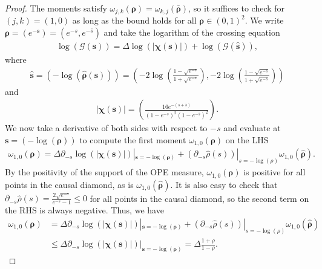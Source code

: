 \documentclass[10pt,a4paper]{amsart}
\newcommand{\De}{\Delta}
\newcommand{\ba}{\begin{equation} \begin{aligned}}
\newcommand{\bs}[1]{\boldsymbol{#1}}
\newcommand{\ea}{\end{aligned} \end{equation}}
\begin{document}
\begin{proof}
The moments satisfy $\omega_{j,k}(\bs{\rho}) = \omega_{k,j}(\bar{\bs{\rho}})$, so it suffices to check for $(j,k) = (1,0)$ as long as the bound holds for all $\bs{\rho} \in (0,1)^2$. We write $\bs{\rho} = (e^{-\bs{s}}) = (e^{-s},e^{-\bar{s}})$ and take the logarithm of the crossing equation
\ba
\log(\mathcal{G}(\bs{s})) = \De \log(|\bs{\chi}(\bs{s})|) + \log( \mathcal{G}( \hat{\bs{s}} )),
\ea
where 
\ba
\hat{\bs{s}} = \left(- \log(\hat{\bs{\rho}}(\bs{s}))\right) = \left(- 2 \log\left(\frac{1-\sqrt{e^{-s}}}{1+\sqrt{e^{-s}}}\right) ,- 2 \log\left(\frac{1-\sqrt{e^{-\bar{s}}}}{1+\sqrt{e^{-\bar{s}}}}\right) \right)
\ea
and 
\ba
|\bs{\chi}(\bs{s})| = \left(  \frac{16 e^{-(s+\bar{s})}}{(1-e^{-s})^2 (1-e^{-\bar{s}})^2}\right).
\ea
We now take a derivative of both sides with respect to $-s$ and evaluate at $\bs{s} = \left(-\log(\bs{\rho}) \right)$ to compute the first moment $\omega_{1,0}(\bs{\rho})$ on the LHS
\ba
\omega_{1,0}(\bs{\rho}) = \De \partial_{-s} \log(|\bs{\chi}(\bs{s})|)|_{\bs{s} = -\log(\bs{\rho})} + \left(\partial_{-s} \hat{\rho}(s) \right)|_{s = -\log(\rho)} \omega_{1,0}(\hat{\bs{\rho}}).
\ea
By the positivity of the support of the OPE measure, $\omega_{1,0}(\bs{\rho})$ is positive for all points in the causal diamond, as is $\omega_{1,0}(\hat{\bs{\rho}})$. It is also easy to check that $\partial_{-s} \hat{\rho}(s) = \frac{2 \sqrt{e^{-s}}}{e^{-s} -1} \leq 0$ for all points in the causal diamond, so the second term on the RHS is always negative. Thus, we have
\ba
\omega_{1,0}(\bs{\rho}) &= \De \partial_{-s} \log(|\bs{\chi}(\bs{s})|)|_{\bs{s} = -\log(\bs{\rho})} + \left(\partial_{-s} \hat{\rho}(s) \right)|_{s = -\log(\rho)} \omega_{1,0}(\hat{\bs{\rho}})\\& \leq \De \partial_{-s} \log(|\bs{\chi}(\bs{s})|)|_{\bs{s} = -\log(\bs{\rho})}  = \De \frac{1+\rho}{1-\rho}.
\ea
\end{proof}
\end{document}
